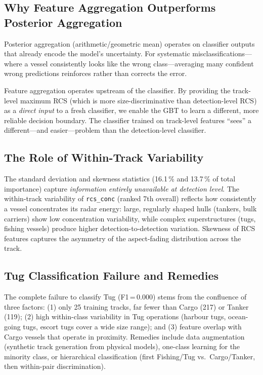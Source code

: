 \documentclass[10pt,journal,compsoc]{IEEEtran}
\begin{document}
\subsection{Why Feature Aggregation Outperforms Posterior Aggregation}

Posterior aggregation (arithmetic/geometric mean) operates on classifier
outputs that already encode the model's uncertainty.  For systematic
misclassifications---where a vessel consistently looks like the wrong
class---averaging many confident wrong predictions reinforces rather than
corrects the error.

Feature aggregation operates upstream of the classifier.  By providing the
track-level maximum RCS (which is more size-discriminative than detection-level
RCS) as a \emph{direct input} to a fresh classifier, we enable the GBT to
learn a different, more reliable decision boundary.  The classifier trained
on track-level features ``sees'' a different---and easier---problem than
the detection-level classifier.

\subsection{The Role of Within-Track Variability}

The standard deviation and skewness statistics (16.1\,\% and 13.7\,\%
of total importance) capture \emph{information entirely unavailable at
detection level}.  The within-track variability of \texttt{rcs\_conc}
(ranked 7th overall) reflects how consistently a vessel concentrates its
radar energy: large, regularly shaped hulls (tankers, bulk carriers) show
low concentration variability, while complex superstructures (tugs, fishing
vessels) produce higher detection-to-detection variation.  Skewness of RCS
features captures the asymmetry of the aspect-fading distribution across the track.

\subsection{Tug Classification Failure and Remedies}

The complete failure to classify Tug (F1\,=\,0.000) stems from the confluence
of three factors: (1) only 25 training tracks, far fewer than Cargo (217) or
Tanker (119); (2) high within-class variability in Tug operations (harbour
tugs, ocean-going tugs, escort tugs cover a wide size range); and (3) feature
overlap with Cargo vessels that operate in proximity.  Remedies include
data augmentation (synthetic track generation from physical models),
one-class learning for the minority class, or hierarchical classification
(first Fishing/Tug vs.\ Cargo/Tanker, then within-pair discrimination).
\end{document}
